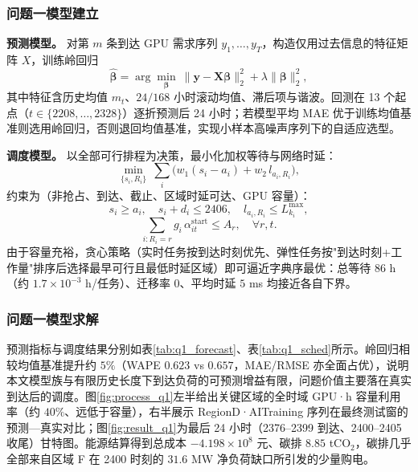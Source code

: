 \subsubsection{问题一模型建立}

\noindent\textbf{预测模型。} 对第 $m$ 条到达 GPU 需求序列 $y_1,\dots,y_T$，构造仅用过去信息的特征矩阵 $X$，训练岭回归\cite{hoerl1970ridge}
\begin{equation}
\hat{\boldsymbol\beta}=\arg\min_{\boldsymbol\beta}\ \lVert \boldsymbol y-\boldsymbol X\boldsymbol\beta\rVert_2^2+\lambda\lVert\boldsymbol\beta\rVert_2^2,
\end{equation}
其中特征含历史均值 $m_t$、$24/168$ 小时滚动均值、滞后项与谐波。回测在 13 个起点（$t\in\{2208,\dots,2328\}$）逐折预测后 24 小时；若模型平均 MAE 优于训练均值基准则选用岭回归，否则退回均值基准，实现小样本高噪声序列下的自适应选型。

\noindent\textbf{调度模型。} 以全部可行排程为决策，最小化加权等待与网络时延：
\begin{equation}
\min_{\{s_i,R_i\}} \ \sum_i \bigl(w_1(s_i-a_i)+w_2\, l_{a_i,R_i}\bigr),
\end{equation}
约束为（非抢占、到达、截止、区域时延可达、GPU 容量）：
\begin{equation}
s_i\ge a_i,\quad s_i+d_i\le 2406,\quad l_{a_i,R_i}\le L_{k_i}^{\max},
\end{equation}
\begin{equation}
\sum_{i:R_i=r} g_i\,\alpha_{it}^{\mathrm{start}}\le A_r,\quad \forall r,t.
\end{equation}
由于容量充裕，贪心策略（实时任务按到达时刻优先、弹性任务按"到达时刻+工作量"排序后选择最早可行且最低时延区域）即可逼近字典序最优：总等待 $86$ h（约 $1.7\times10^{-3}$ h/任务）、迁移率 $0$、平均时延 $5$ ms 均接近各自下界。

\subsubsection{问题一模型求解}

预测指标与调度结果分别如表\ref{tab:q1_forecast}、表\ref{tab:q1_sched}所示。岭回归相较均值基准提升约 $5\%$（WAPE $0.623$ vs $0.657$，MAE/RMSE 亦全面占优），说明本文模型族与有限历史长度下到达负荷的可预测增益有限，问题价值主要落在真实到达后的调度。图\ref{fig:process_q1}左半给出关键区域的全时域 GPU·h 容量利用率（约 $40\%$、远低于容量），右半展示 RegionD·AITraining 序列在最终测试窗的预测—真实对比；图\ref{fig:result_q1}为最后 24 小时（2376--2399 到达、2400--2405 收尾）甘特图。能源结算得到总成本 $-4.198\times10^8$ 元、碳排 $8.85$ tCO$_2$，碳排几乎全部来自区域 F 在 2400 时刻的 $31.6$ MW 净负荷缺口所引发的少量购电。

